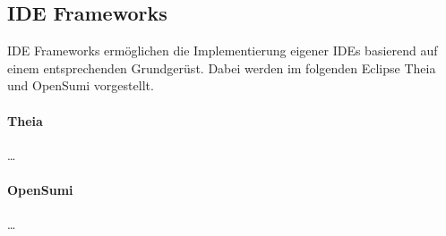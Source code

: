\subsection{IDE Frameworks}\label{section:stand-der-technik:weitere-entwicklungen:ide-frameworks}

IDE Frameworks ermöglichen die Implementierung eigener IDEs basierend auf einem entsprechenden Grundgerüst. Dabei werden im folgenden Eclipse Theia  und OpenSumi  vorgestellt.

\paragraph{Theia} \dots

\paragraph{OpenSumi} \dots

